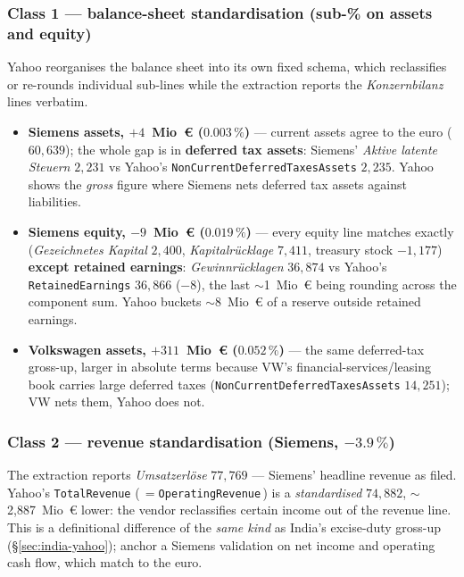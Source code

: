 \documentclass[11pt,a4paper]{report}
\begin{document}
\subsubsection*{Class 1 --- balance-sheet standardisation (sub-\% on assets and equity)}
Yahoo reorganises the balance sheet into its own fixed schema, which reclassifies or re-rounds individual
sub-lines while the extraction reports the \emph{Konzernbilanz} lines verbatim.

\begin{itemize}
  \item \textbf{Siemens assets, $+4$~Mio~€ ($0.003\,\%$)} --- current assets agree to the euro
    ($60{,}639$); the whole gap is in \textbf{deferred tax assets}: Siemens' \emph{Aktive latente Steuern}
    $2{,}231$ vs Yahoo's \texttt{NonCurrentDeferredTaxesAssets} $2{,}235$. Yahoo shows the \emph{gross}
    figure where Siemens nets deferred tax assets against liabilities.
  \item \textbf{Siemens equity, $-9$~Mio~€ ($0.019\,\%$)} --- every equity line matches exactly
    (\emph{Gezeichnetes Kapital} $2{,}400$, \emph{Kapitalr\"ucklage} $7{,}411$, treasury stock $-1{,}177$)
    \textbf{except retained earnings}: \emph{Gewinnr\"ucklagen} $36{,}874$ vs Yahoo's
    \texttt{RetainedEarnings} $36{,}866$ ($-8$), the last $\sim$1~Mio~€ being rounding across the component
    sum. Yahoo buckets $\sim$8~Mio~€ of a reserve outside retained earnings.
  \item \textbf{Volkswagen assets, $+311$~Mio~€ ($0.052\,\%$)} --- the same deferred-tax gross-up, larger in
    absolute terms because VW's financial-services/leasing book carries large deferred taxes
    (\texttt{NonCurrentDeferredTaxesAssets} $14{,}251$); VW nets them, Yahoo does not.
\end{itemize}

\subsubsection*{Class 2 --- revenue standardisation (Siemens, $-3.9\,\%$)}
The extraction reports \emph{Umsatzerl\"ose} $77{,}769$ --- Siemens' headline revenue as filed. Yahoo's
\texttt{TotalRevenue} (\,$=$\texttt{OperatingRevenue}\,) is a \emph{standardised} $74{,}882$, $\sim$2{,}887~Mio~€
lower: the vendor reclassifies certain income out of the revenue line. This is a definitional difference of the
\emph{same kind} as India's excise-duty gross-up (\S\ref{sec:india-yahoo}); anchor a Siemens validation on net
income and operating cash flow, which match to the euro.
\end{document}
